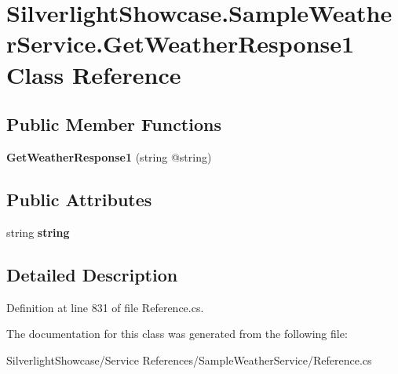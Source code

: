 \hypertarget{class_silverlight_showcase_1_1_sample_weather_service_1_1_get_weather_response1}{
\section{SilverlightShowcase.SampleWeatherService.GetWeatherResponse1 Class Reference}
\label{class_silverlight_showcase_1_1_sample_weather_service_1_1_get_weather_response1}
}
\subsection*{Public Member Functions}
\begin{DoxyCompactItemize}
\item 
\hypertarget{class_silverlight_showcase_1_1_sample_weather_service_1_1_get_weather_response1_a641ca289ffc23578bbd24b20a6fac406}{
{\bfseries GetWeatherResponse1} (string @string)}
\label{class_silverlight_showcase_1_1_sample_weather_service_1_1_get_weather_response1_a641ca289ffc23578bbd24b20a6fac406}

\end{DoxyCompactItemize}
\subsection*{Public Attributes}
\begin{DoxyCompactItemize}
\item 
\hypertarget{class_silverlight_showcase_1_1_sample_weather_service_1_1_get_weather_response1_a4fa82a31da7cfd8f3e103888171a713b}{
string {\bfseries string}}
\label{class_silverlight_showcase_1_1_sample_weather_service_1_1_get_weather_response1_a4fa82a31da7cfd8f3e103888171a713b}

\end{DoxyCompactItemize}


\subsection{Detailed Description}


Definition at line 831 of file Reference.cs.

The documentation for this class was generated from the following file:\begin{DoxyCompactItemize}
\item 
SilverlightShowcase/Service References/SampleWeatherService/Reference.cs\end{DoxyCompactItemize}
